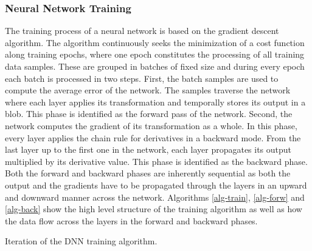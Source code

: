 \subsubsection{Neural Network Training}
The training process of a neural network is based on the gradient
descent algorithm. The algorithm continuously seeks the minimization of a cost function along training epochs, where one epoch 
constitutes the processing of all training data samples. These are 
grouped in batches of fixed size and during every epoch each batch 
is processed in two steps. First, the batch samples are used to 
compute the average error of the network. The samples 
traverse the network where each layer applies its transformation and 
temporally stores its output in a blob. This phase is identified as 
the forward pass of the network. Second, the network computes the 
gradient of its transformation as a whole. In this phase, every layer 
applies the chain rule for derivatives in a backward mode. From the 
last layer up to the first one in the network, each layer propagates 
its output multiplied by its derivative value. This phase is identified 
as the backward phase. Both the forward and backward phases are 
inherently sequential as both the output and the gradients have to 
be propagated through the layers in an upward and downward manner across 
the network. Algorithms \ref{alg-train}, \ref{alg-forw} and \ref{alg-back} 
show the high level structure of the training algorithm as well as 
how the data flow across the layers in the forward and backward phases.
 
\begin{algorithm}
\caption{Iteration of the DNN training algorithm.}
\label{alg-train}
\BlankLine
\For{$b\leftarrow 1$ \KwTo $B$}{
\BlankLine
    top[1]=layers(1)$\rightarrow$ forward(batches[b]);
\BlankLine
    \For{$l\leftarrow 2$ \KwTo $L$}{
      top[l]=layers(l)$\rightarrow$ forward(top[l-1]);
    }
\BlankLine
    diffs[1]=layers(L)$\rightarrow$ backward(top[L]);
\BlankLine
    \For{$l\leftarrow L-1$ \KwTo $1$}{
      diffs[l]=layers(l)$\rightarrow$ backward(top[l],diffs[l+1]);
    }
updateCoefficients(layers, top, diffs);
  }
\end{algorithm}

